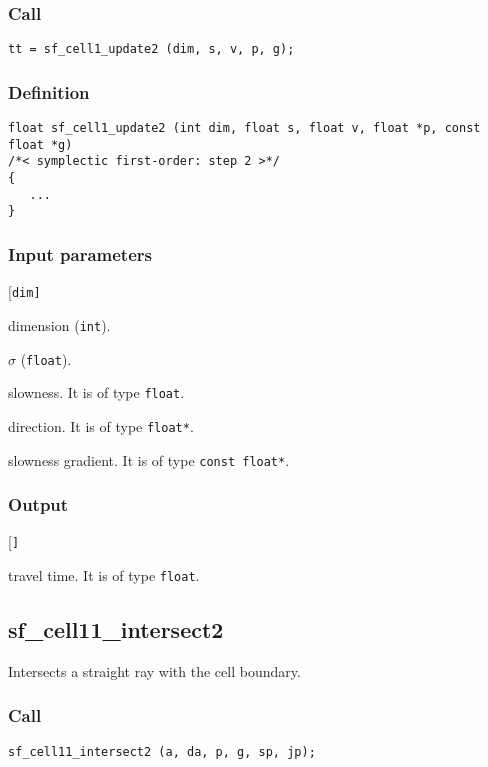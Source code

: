 \subsubsection*{Call}
\begin{verbatim}tt = sf_cell1_update2 (dim, s, v, p, g);\end{verbatim}

\subsubsection*{Definition}
\begin{verbatim}
float sf_cell1_update2 (int dim, float s, float v, float *p, const float *g) 
/*< symplectic first-order: step 2 >*/
{
   ...
}
\end{verbatim}

\subsubsection*{Input parameters}
\begin{desclist}{\tt }{\quad}[\tt dim]
   \setlength\itemsep{0pt}
   \item[dim] dimension (\texttt{int}).  
   \item[s]   $\sigma$ (\texttt{float}).
   \item[v]   slowness. It is of type \texttt{float}.
   \item[p]   direction. It is of type \texttt{float*}.
   \item[g]   slowness gradient. It is of type \texttt{const float*}.
\end{desclist}

\subsubsection*{Output}
\begin{desclist}{ }{\quad}[\tt ]
   \setlength\itemsep{0pt}  
   \item[0.5*v*v*s*(1. - s*pg)] travel time. It is of type \texttt{float}.
\end{desclist}




\subsection{{sf\_cell11\_intersect2}}
Intersects a straight ray with the cell boundary.

\subsubsection*{Call}
\begin{verbatim}sf_cell11_intersect2 (a, da, p, g, sp, jp);\end{verbatim}

